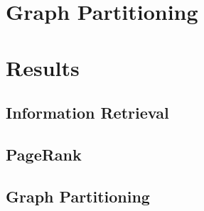 \documentclass[12 pt]{article}
\begin{document}
\section{Graph Partitioning}

\section{Results}
\subsection{Information Retrieval}
\subsection{PageRank}
\subsection{Graph Partitioning}
\end{document}
